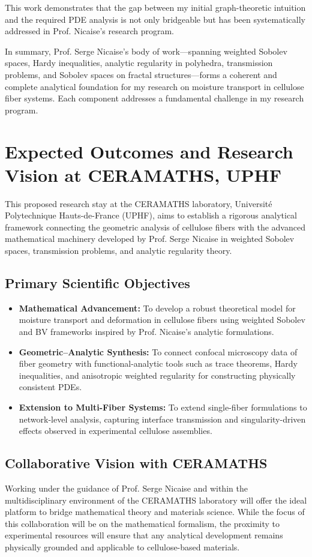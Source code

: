 \documentclass[11pt]{article}
\begin{document}
This work demonstrates that the gap between my initial graph-theoretic intuition and the required PDE analysis is not only bridgeable but has been systematically addressed in Prof. Nicaise's research program.

\medskip
\noindent
In summary, Prof. Serge Nicaise’s body of work—spanning weighted Sobolev spaces, Hardy inequalities, analytic regularity in polyhedra, transmission problems, and Sobolev spaces on fractal structures—forms a coherent and complete analytical foundation for my research on moisture transport in cellulose fiber systems. Each component addresses a fundamental challenge in my research program.

\section{Expected Outcomes and Research Vision at CERAMATHS, UPHF}

This proposed research stay at the CERAMATHS laboratory, Université Polytechnique Hauts-de-France (UPHF), aims to establish a rigorous analytical framework connecting the geometric analysis of cellulose fibers with the advanced mathematical machinery developed by Prof. Serge Nicaise in weighted Sobolev spaces, transmission problems, and analytic regularity theory.

\subsection*{Primary Scientific Objectives}
\begin{itemize}
    \item \textbf{Mathematical Advancement:} To develop a robust theoretical model for moisture transport and deformation in cellulose fibers using weighted Sobolev and BV frameworks inspired by Prof. Nicaise’s analytic formulations.
    \item \textbf{Geometric–Analytic Synthesis:} To connect confocal microscopy data of fiber geometry with functional-analytic tools such as trace theorems, Hardy inequalities, and anisotropic weighted regularity for constructing physically consistent PDEs.
    \item \textbf{Extension to Multi-Fiber Systems:} To extend single-fiber formulations to network-level analysis, capturing interface transmission and singularity-driven effects observed in experimental cellulose assemblies.
\end{itemize}

\subsection*{Collaborative Vision with CERAMATHS}
Working under the guidance of Prof. Serge Nicaise and within the multidisciplinary environment of the CERAMATHS laboratory will offer the ideal platform to bridge mathematical theory and materials science. While the focus of this collaboration will be on the mathematical formalism, the proximity to experimental resources will ensure that any analytical development remains physically grounded and applicable to cellulose-based materials.
\end{document}
